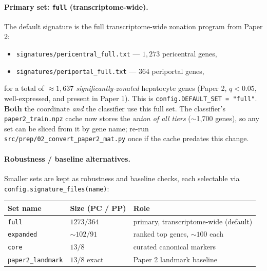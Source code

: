 \documentclass[11pt]{article}
\newcommand{\code}[1]{\texttt{\small #1}}
\begin{document}
\paragraph{Primary set: \code{full} (transcriptome-wide).}
The default signature is the full transcriptome-wide zonation program from Paper 2:
\begin{itemize}[leftmargin=1.4em]
  \item \code{signatures/pericentral\_full.txt} --- $1{,}273$ pericentral genes,
  \item \code{signatures/periportal\_full.txt} --- $364$ periportal genes,
\end{itemize}
for a total of $\approx 1{,}637$ \emph{significantly-zonated} hepatocyte genes (Paper 2,
$q < 0.05$, well-expressed, and present in Paper 1). This is \code{config.DEFAULT\_SET = "full"}.
\textbf{Both} the coordinate \emph{and} the classifier use this full set. The classifier's
\code{paper2\_train.npz} cache now stores the \emph{union of all tiers} ($\sim$1{,}700 genes), so any
set can be sliced from it by gene name; re-run \code{src/prep/02\_convert\_paper2\_mat.py} once if the
cache predates this change.

\paragraph{Robustness / baseline alternatives.}
Smaller sets are kept as robustness and baseline checks, each selectable via
\code{config.signature\_files(name)}:
\begin{center}
\begin{tabular}{@{}l l l@{}}
\toprule
\textbf{Set name} & \textbf{Size (PC / PP)} & \textbf{Role} \\
\midrule
\code{full}            & $1273 / 364$ & primary, transcriptome-wide (default) \\
\code{expanded}        & $\sim 102 / 91$ & ranked top genes, $\sim\!100$ each \\
\code{core}            & $13 / 8$ & curated canonical markers \\
\code{paper2\_landmark} & $13 / 8$ exact & Paper 2 landmark baseline \\
\bottomrule
\end{tabular}
\end{center}
\end{document}
